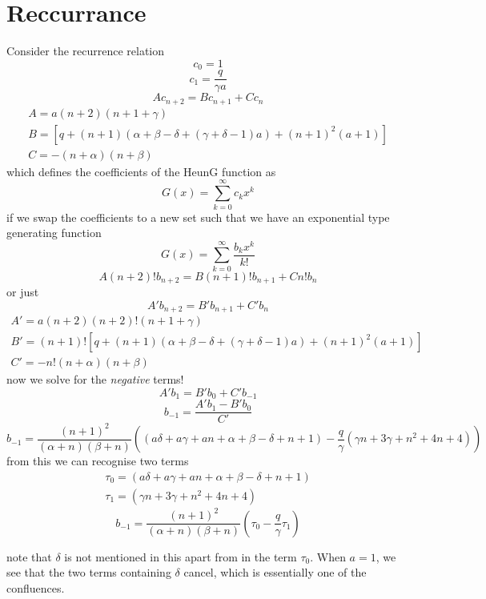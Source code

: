 \documentclass{article}
\begin{document}
\section{Reccurrance}
Consider the recurrence relation
$$
c_0 = 1
$$
$$
c_1 = \frac{q}{\gamma a}
$$
$$
A c_{n+2} = B c_{n+1} +Cc_n
$$
\begin{align}
A = a(n+2)(n+1+\gamma)\\
B = [q+(n+1)(\alpha+\beta-\delta+(\gamma+\delta-1)a)+(n+1)^2(a+1)] \\
C = -(n+\alpha)(n+\beta)
\end{align}
which defines the coefficients of the HeunG function as 
$$
G(x) = \sum_{k=0}^\infty c_k x^k
$$
if we swap the coefficients to a new set such that we have an exponential type generating function
$$
G(x) = \sum_{k=0}^\infty \frac{b_k x^k}{k!}
$$
$$
A (n+2)! b_{n+2} = B (n+1)! b_{n+1} + C n! b_n
$$
or just 
$$
A' b_{n+2} = B' b_{n+1} + C' b_n
$$
\begin{align}
A' = a(n+2)(n+2)!(n+1+\gamma)\\
B' = (n+1)![q+(n+1)(\alpha+\beta-\delta+(\gamma+\delta-1)a)+(n+1)^2(a+1)] \\
C' = -n!(n+\alpha)(n+\beta)
\end{align}
now we solve for the \emph{negative} terms! 
$$
A' b_{1} = B' b_{0} + C' b_{-1}
$$
$$
b_{-1} = \frac{A' b_{1} - B' b_{0}}{C'} 
$$
$$
b_{-1} = \frac{(n+1)^2 }{(\alpha+n) (\beta+n)}\left((a \delta+a \gamma+a n+\alpha+\beta-\delta+n+1)-\frac{q}{\gamma} \left(\gamma n+3 \gamma+n^2+4 n+4\right) \right)
$$
from this we can recognise two terms 
\begin{align}
\tau_0 = (a \delta+a \gamma+a n+\alpha+\beta-\delta+n+1) \\
\tau_1 = \left(\gamma n+3 \gamma+n^2+4 n+4\right)
\end{align}
$$
b_{-1} = \frac{(n+1)^2 }{(\alpha+n) (\beta+n)}(\tau_0-\frac{q}{\gamma} \tau_1)
$$




note that $\delta$ is not mentioned in this apart from in the term $\tau_0$. When $a=1$, we see that the two terms containing $\delta$ cancel, which is essentially one of the confluences.
\end{document}

